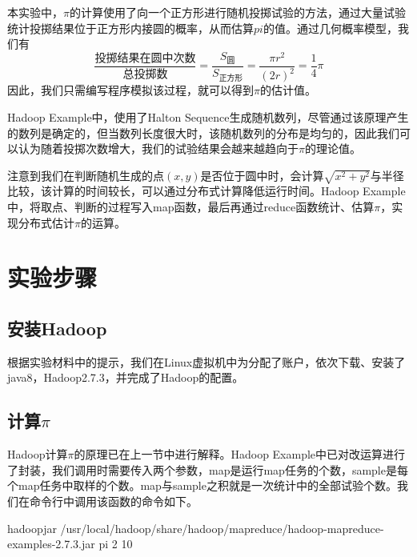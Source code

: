 \documentclass{article}
\begin{document}
本实验中，$\pi$的计算使用了向一个正方形进行随机投掷试验的方法，通过大量试验统计投掷结果位于正方形内接圆的概率，从而估算$pi$的值。通过几何概率模型，我们有
$$\frac{\mbox{投掷结果在圆中次数}}{\mbox{总投掷数}}=\frac{S_{\mbox{圆}}}{S_{\mbox{正方形}}} = \frac{\pi r^2}{(2r)^2} = \frac{1}{4}\pi$$
因此，我们只需编写程序模拟该过程，就可以得到$\pi$的估计值。

Hadoop Example中，使用了Halton Sequence生成随机数列，尽管通过该原理产生的数列是确定的，但当数列长度很大时，该随机数列的分布是均匀的，因此我们可以认为随着投掷次数增大，我们的试验结果会越来越趋向于$\pi$的理论值。

注意到我们在判断随机生成的点$(x,y)$是否位于圆中时，会计算$\sqrt{x^2+y^2}$与半径比较，该计算的时间较长，可以通过分布式计算降低运行时间。Hadoop Example中，将取点、判断的过程写入map函数，最后再通过reduce函数统计、估算$\pi$，实现分布式估计$\pi$的运算。

\section{实验步骤}

\subsection{安装Hadoop}

根据实验材料中的提示，我们在Linux虚拟机中为分配了账户，依次下载、安装了java8，Hadoop2.7.3，并完成了Hadoop的配置。

\subsection{计算$\pi$}

Hadoop计算$\pi$的原理已在上一节中进行解释。Hadoop Example中已对改运算进行了封装，我们调用时需要传入两个参数，map是运行map任务的个数，sample是每个map任务中取样的个数。map与sample之积就是一次统计中的全部试验个数。我们在命令行中调用该函数的命令如下。
\begin{python}
hadoopjar /usr/local/hadoop/share/hadoop/mapreduce/hadoop-mapreduce-examples-2.7.3.jar pi 2 10
\end{python}
\end{document}
